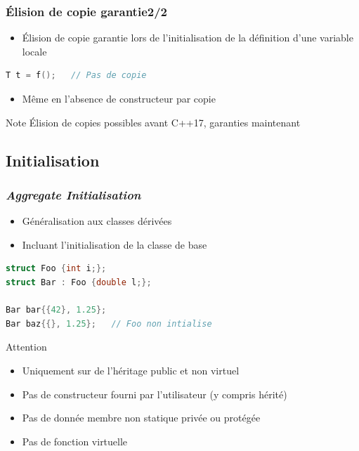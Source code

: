 \documentclass[C++.tex]{subfiles}
\begin{document}
\begin{frame}[fragile]
	\frametitle{Élision de copie garantie\titlehfill{}2/2}

	\begin{itemize}
		\item Élision de copie garantie  lors de l'initialisation de la définition d'une variable locale
	\end{itemize}

	\begin{lstlisting}[language=C++]
T t = f();   // Pas de copie\end{lstlisting}

	\begin{itemize}
		\item Même en l'absence de constructeur par copie
	\end{itemize}

	\begin{block}{Note}
		Élision de copies possibles avant C++17, garanties maintenant
	\end{block}
\end{frame}

\subsection*{Initialisation}
\begin{frame}[fragile]
	\frametitle{\textit{Aggregate Initialisation}}
	\begin{itemize}
		\item Généralisation aux classes dérivées
		\item Incluant l'initialisation de la classe de base
	\end{itemize}

	\begin{lstlisting}[language=C++]
struct Foo {int i;};
struct Bar : Foo {double l;};

Bar bar{{42}, 1.25};
Bar baz{{}, 1.25};   // Foo non intialise\end{lstlisting}

	\begin{alertblock}{Attention}
		\begin{itemize}
			\item Uniquement sur de l'héritage public et non virtuel
			\item Pas de constructeur fourni par l'utilisateur (y compris hérité)
			\item Pas de donnée membre non statique privée ou protégée
			\item Pas de fonction virtuelle
		\end{itemize}
	\end{alertblock}

\end{frame}
\end{document}

